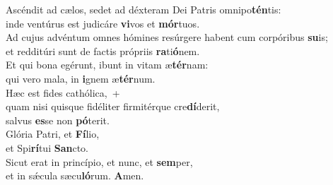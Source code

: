 \oddverse Ascéndit ad cælos, sedet ad déxteram Dei Patris omnipo\textbf{tén}tis:~\*\\
\oddverse inde ventúrus est judicáre \textbf{vi}vos et \textbf{mór}tuos.\\
\evenverse Ad cujus advéntum omnes hómines resúrgere habent cum corpóribus \textbf{su}is;~\*\\
\evenverse et redditúri sunt de factis própriis \textbf{ra}ti\textbf{ó}nem.\\
\oddverse Et qui bona egérunt, ibunt in vitam æ\textbf{tér}nam:~\*\\
\oddverse qui vero mala, in \textbf{i}gnem æ\textbf{tér}num.\\
\evenverse Hæc est fides cathólica,~+\\
\evenverse  quam nisi quisque fidéliter firmitérque cre\textbf{dí}derit,~\*\\
\evenverse salvus \textbf{es}se non \textbf{pó}terit.\\
\oddverse Glória Patri, et \textbf{Fí}lio,~\*\\
\oddverse et Spi\textbf{rí}tui \textbf{San}cto.\\
\evenverse Sicut erat in princípio, et nunc, et \textbf{sem}per,~\*\\
\evenverse et in sǽcula sæcu\textbf{ló}rum. \textbf{A}men.\\
